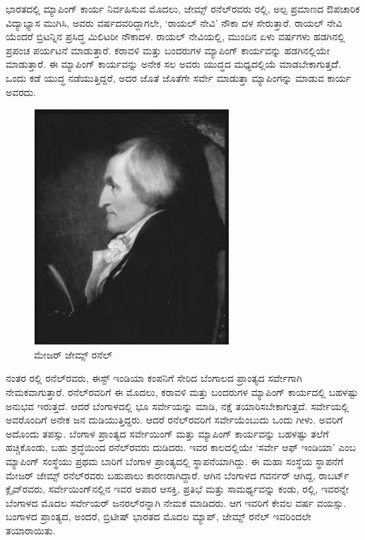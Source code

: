 ಭಾರತದಲ್ಲಿ ಮ್ಯಾಪಿಂಗ್​ ಕಾರ್ಯ ನಿರ್ವಹಿಸುವ ಮೊದಲು, ಜೇಮ್ಸ್ ರನೆಲ್​ರವರು  ರಲ್ಲಿ, ಅಲ್ಪ ಪ್ರಮಾಣದ ಔಪಚಾರಿಕ ವಿದ್ಯಾಭ್ಯಾಸ ಮುಗಿಸಿ, ಅವರು  ವರ್ಷದವರಿದ್ದಾಗಲೇ, ‘ರಾಯಲ್​ ನೇವಿ’ ನೌಕಾ ದಳ ಸೇರುತ್ತಾರೆ. ರಾಯಲ್​ ನೇವಿ ಯೆಂದರೆ ಬ್ರಿಟನ್ನಿನ ಪ್ರಸಿದ್ಧ ಮಿಲಿಟರೀ ನೌಕಾದಳ. ರಾಯಲ್​ ನೇವಿಯಲ್ಲಿ, ಮುಂದಿನ ಏಳು ವರ್ಷಗಳು ಹಡಗಿನಲ್ಲಿ ಪ್ರಪಂಚ ಪರ್ಯಟನೆ ಮಾಡುತ್ತಾರೆ. ಕರಾವಳಿ ಮತ್ತು ಬಂದರುಗಳ ಮ್ಯಾಪಿಂಗ್​ ಕಾರ್ಯವನ್ನು ಹಡಗಿನಲ್ಲಿಯೇ ಮಾಡುತ್ತಾರೆ. ಈ ಮ್ಯಾಪಿಂಗ್​ ಕಾರ್ಯವನ್ನು ಅನೇಕ ಸಲ ಅವರು ಯುದ್ಧದ ಮಧ್ಯದಲ್ಲಿಯೆ ಮಾಡಬೇಕಾಗುತ್ತದೆೆ. ಒಂದು ಕಡೆ ಯುದ್ಧ ನಡೆಯುತ್ತಿದ್ದರೆ, ಅದರ ಜೊತೆ ಜೊತೆಗೇ ಸರ್ವೇ ಮಾಡುತ್ತಾ ಮ್ಯಾಪಿಂಗನ್ನು ಮಾಡುವ ಕಾರ್ಯ ಅವರದು.

\begin{figure}[!htbp]
\includegraphics[scale=1.1]{"images/image017.jpg"}
\caption{ಮೇಜರ್​ ಜೇಮ್ಸ್ ರನೆಲ್​}\label{art13-fig1}
\end{figure}

ನಂತರ  ರಲ್ಲಿ ರನೆಲ್​ರವರು, ಈಸ್ಟ್​ ಇಂಡಿಯಾ ಕಂಪನಿಗೆ ಸೇರಿದ ಬೆಂಗಾಲದ ಪ್ರಾಂತ್ಯದ ಸರ್ವೇಗಾಗಿ ನೇಮಕವಾಗುತ್ತಾರೆ. ರನೆಲ್​ರವರಿಗೆ ಈ ಮೊದಲು, ಕರಾವಳಿ ಮತ್ತು ಬಂದರುಗಳ ಮ್ಯಾಪಿಂಗ್​ ಕಾರ್ಯದಲ್ಲಿ ಬಹಳಷ್ಟು ಅನುಭವ ಇರುತ್ತದೆ. ಆದರೆ ಬೆಂಗಾಳದಲ್ಲಿ ಭೂ ಸರ್ವೇಯನ್ನು ಮಾಡಿ, ನಕ್ಷೆ ತಯಾರಿಸಬೇಕಾಗುತ್ತದೆ. ಸರ್ವೇಯಲ್ಲಿ ಅವರೊಂದಿಗೆ ಅನೇಕ ಜನ ದುಡಿಯುತ್ತಿದ್ದರು. ಆದರೆ ರನೆಲ್​ರವರಿಗೆ ಸರ್ವೇಯೆಂಬುದು ಒಂದು ಗೀಳು. ಅವರಿಗೆ ಅದೊಂದು ತಪಸ್ಸು. ಬೆಂಗಾಳ ಪ್ರಾಂತ್ಯದ ಸರ್ವೇಯಿಂಗ್​ ಮತ್ತು ಮ್ಯಾಪಿಂಗ್​ ಕಾರ್ಯವನ್ನು ಬಹಳಷ್ಟು ತಲೆಗೆ ಹಚ್ಚಿಕೊಂಡು, ಬಹು ಶ್ರದ್ಧೆಯಿಂದ ರನೆಲ್​ರವರು ದುಡಿದರು. ಇವರ ಕಾಲದಲ್ಲಿಯೇ ‘ಸರ್ವೇ ಆಫ್​ ಇಂಡಿಯಾ’ ಎಂಬ ಮ್ಯಾಪಿಂಗ್​ ಸಂಸ್ಥೆಯು ಪ್ರಥಮ ಬಾರಿಗೆ ಬೆಂಗಾಳ ಪ್ರಾಂತ್ಯದಲ್ಲಿ ಸ್ಥಾಪನೆಯಾಗಿದ್ದು. ಈ ಮಹಾ ಸಂಸ್ಥೆಯ ಸ್ಥಾಪನೆಗೆ ಮೇಜರ್​ ಜೇಮ್ಸ್ ರನೆಲ್​ರವರು ಬಹುಪಾಲು ಕಾರಣರಾಗಿದ್ದಾರೆ. ಆಗಿನ ಬೆಂಗಾಳದ ಗವರ್ನರ್​ ಆಗಿದ್ದ, ರಾಬರ್ಟ್ ಕ್ಲೈವ್​ರವರು, ಸರ್ವೇಯಿಂಗ್​ನಲ್ಲಿನ ಇವರ ಅಪಾರ ಆಸಕ್ತಿ, ಪ್ರತಿಭೆ ಮತ್ತು ಸಾಮರ್ಥ್ಯವನ್ನು ಕಂಡು,  ರಲ್ಲಿ, ಇವರನ್ನೇ ಬೆಂಗಾಳದ ಮೊದಲ ಸರ್ವೇಯರ್​ ಜನರಲ್​ರನ್ನಾಗಿ ನೇಮಕ ಮಾಡಿದರು. ಆಗ ಇವರಿಗೆ ಕೇವಲ  ವರ್ಷ ವಯಸ್ಸು. ಬಂಗಾಳದ ಪ್ರಾಂತ್ಯದ, ಅಂದರೆ, ಬ್ರಿಟೀಷ್​ ಭಾರತದ ಮೊದಲ ಮ್ಯಾಪ್​, ಜೇಮ್ಸ್ ರನೆಲ್​ ಇವರಿಂದಲೇ ತಯಾರಾಯಿತು.

